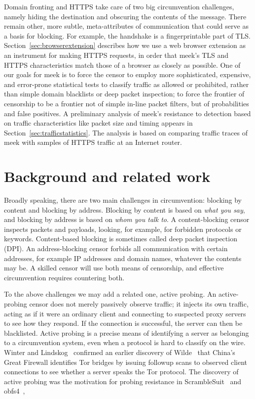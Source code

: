 \documentclass[conference]{IEEEtran}
\begin{document}
Domain fronting and HTTPS take care of two big circumvention challenges,
namely hiding the destination and obscuring the contents of the message.
There remain other, more subtle, meta-attributes of communication
that could serve as a basis for blocking.
For example, the handshake is a fingerprintable part of TLS.
Section~\ref{sec:browserextension} describes how we use a web browser extension as an instrument for making HTTPS requests,
in order that meek's TLS and HTTPS characteristics
match those of a browser as closely as possible.
One of our goals for meek is to force the censor
to employ more sophisticated, expensive, and error-prone statistical tests
to classify traffic as allowed or prohibited,
rather than simple domain blacklists or deep packet inspection;
to force the frontier of censorship
to be a frontier not of simple in-line packet filters,
but of probabilities and false positives.
A preliminary analysis of meek's resistance to detection
based on traffic characteristics like packet size and timing
appears in Section~\ref{sec:trafficstatistics}.
The analysis is based on comparing traffic traces of meek
with samples of HTTPS traffic at an Internet router.


\section{Background and related work}
\label{sec:related-work}

Broadly speaking, there are two main challenges in circumvention:
blocking by content and blocking by address.
Blocking by content is based on \emph{what you say},
and blocking by address is based on \emph{whom you talk to}.
A content-blocking censor inspects packets and payloads,
looking, for example, for forbidden protocols or keywords.
Content-based blocking is sometimes called deep packet inspection (DPI).
An address-blocking censor forbids all communication with certain
addresses, for example IP addresses and domain names, whatever the contents may be.
A skilled censor will use both means of censorship,
and effective circumvention requires countering both.

To the above challenges we may add a related one, active probing.
An active-probing censor does not merely passively observe traffic;
it injects its own traffic,
acting as if it were an ordinary client and connecting to suspected
proxy servers to see how they respond.
If the connection is successful, the server can then be blacklisted.
Active probing is a precise means of identifying a server as belonging to a circumvention system,
even when a protocol is hard to classify on the wire.
Winter and Lindskog~\cite{foci12-winter} confirmed an earlier discovery of
Wilde~\cite{wilde} that China's Great Firewall identifies Tor bridges
by issuing followup scans to observed client connections to see
whether a server speaks the Tor protocol.
The discovery of active probing was the motivation for probing resistance in ScrambleSuit~\cite{scramblesuit}
and obfs4~\cite{obfs4},
\end{document}
